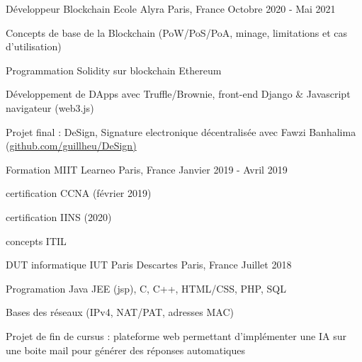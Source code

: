 
\begin{cventries}
    \cventry
    {Développeur Blockchain} %
    {Ecole Alyra} %
    {Paris, France} %
    {Octobre 2020 - Mai 2021} %
    {
      \begin{cvitems} %
        \item Concepts de base de la Blockchain (PoW/PoS/PoA, minage, limitations et cas d'utilisation)
        \item Programmation Solidity sur blockchain Ethereum
        \item Développement de DApps avec Truffle/Brownie, front-end Django \& Javascript navigateur (web3.js)
        \item Projet final : DeSign, Signature electronique décentralisée avec Fawzi Banhalima  (\underline{github.com/guillheu/DeSign)}
      \end{cvitems}
    }
    \cventry
    {Formation MIIT} %
    {Learneo} %
    {Paris, France} %
    {Janvier 2019 - Avril 2019} %
    {
      \begin{cvitems} %
        \item certification CCNA (février 2019)
        \item certification IINS (2020)
        \item concepts ITIL\\
      \end{cvitems}
    }
    \cventry
    {DUT informatique} %
    {IUT Paris Descartes} %
    {Paris, France} %
    {Juillet 2018} %
    {
      \begin{cvitems} %
        \item Programation Java JEE (jsp), C, C++, HTML/CSS, PHP, SQL
        \item Bases des réseaux (IPv4, NAT/PAT, adresses MAC)
        \item {Projet de fin de cursus : plateforme web permettant d'implémenter une IA sur une boite mail pour générer des réponses automatiques}
      \end{cvitems}
    }
\end{cventries}
